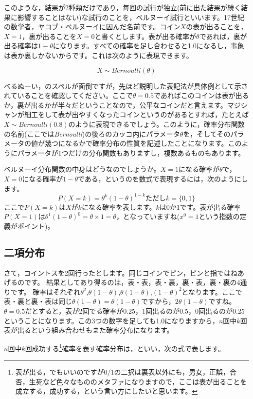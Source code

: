 \documentclass{ltjbook}
\begin{document}
このような，結果が2種類だけであり，毎回の試行が独立(前に出た結果が続く結果に影響することはない)な試行のことを，ベルヌーイ試行といいます。17世紀の数学者，ヤコブ・ベルヌーイに因んだ名前です。コイン$X$の表が出ることを，$X=1$，裏が出ることを$X=0$と書くとします。表が出る確率が$\theta$であれば，裏が出る確率は$1-\theta$になります。すべての確率を足し合わせると1.0になるし，事象は表か裏しかないからです。これは次のように表現できます。

\[ X \sim Bernoulli(\theta) \]

べるぬーい，のスペルが面倒ですが，先ほど説明した表記法が具体例として示されていることを確認してください。ここで$\theta=0.5$であればこのコインは表が出るか，裏が出るかが半々だということなので，公平なコインだと言えます。マジシャンが細工をして表が出やすくなったコインというのがあるとすれば，たとえば$X \sim Bernoulli(0.8)$のように表現できるでしょう。このように，確率分布関数の名前(ここでは\textit{Bernoulli})の後ろのカッコ内にパラメータ$\theta$を，そしてそのパラメータの値が幾つになるかで確率分布の性質を記述したことになります。このようにパラメータが1つだけの分布関数もありますし，複数あるものもあります。

ベルヌーイ分布関数の中身はどうなのでしょうか。$X=1$になる確率が$\theta$で，$X=0$になる確率が$1-\theta$である，というのを数式で表現するには，次のようにします。
\[  P(X=k) = \theta^k(1-\theta)^{1-k} \mbox{ただし$k=\{0,1\}$} \]
ここで$P(X=k)$は$X$が$k$になる確率を表します。$k$は0か1です。表が出る確率$P(X=1)$は$\theta^1(1-\theta)^0=\theta \times 1=\theta$，となっていますね($x^0=1$という指数の定義がポイント)。

\subsection{二項分布}
さて，コイントスを2回行ったとします。同じコインでピン，ピンと指ではねあげるのです。
結果としてあり得るのは，表・表，表・裏，裏・表，裏・裏の4通りです。
確率はそれぞれ$\theta^2$,$\theta(1-\theta)$,$\theta(1-\theta)$,$(1-\theta)^2$となります。ここで表・裏と裏・表は同じ$\theta(1-\theta)=\theta(1-\theta)$ですから，$2\theta(1-\theta)$ですね。$\theta=0.5$だとすると，表が2回でる確率が0.25，1回出るのが0.5，0回出るのが0.25ということになります。この3つの数字を足しても1.0になりますから，$n$回中$k$回表が出るという組み合わせもまた確率分布になります。

$n$回中$k$回成功する\footnote{表が出る，でもいいのですが0/1の二択は裏表以外にも，男女，正誤，合否，生死など色々なもののメタファになりますので，ここは表が出ることを成立する，成功する，という言い方にしたいと思います。}確率を表す確率分布は，といい，次の式で表します。
\end{document}
